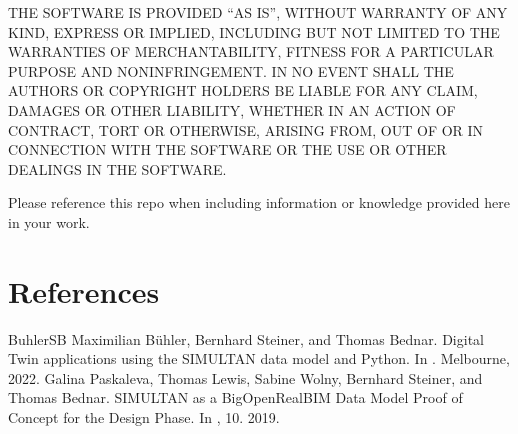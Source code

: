 \documentclass[letterpaper,10pt,english]{jupyterBook}
\begin{document}
\sphinxAtStartPar
THE SOFTWARE IS PROVIDED “AS IS”, WITHOUT WARRANTY OF ANY KIND, EXPRESS OR IMPLIED, INCLUDING BUT NOT LIMITED TO THE
WARRANTIES OF MERCHANTABILITY, FITNESS FOR A PARTICULAR PURPOSE AND NONINFRINGEMENT. IN NO EVENT SHALL THE AUTHORS OR
COPYRIGHT HOLDERS BE LIABLE FOR ANY CLAIM, DAMAGES OR OTHER LIABILITY, WHETHER IN AN ACTION OF CONTRACT, TORT OR
OTHERWISE, ARISING FROM, OUT OF OR IN CONNECTION WITH THE SOFTWARE OR THE USE OR OTHER DEALINGS IN THE SOFTWARE.

\sphinxAtStartPar
Please reference this repo when including information or knowledge provided here in your work.

\sphinxstepscope


\chapter{References}
\label{\detokenize{References:references}}\label{\detokenize{References:id1}}\label{\detokenize{References::doc}}
\begin{sphinxthebibliography}{BuhlerSB}
\sphinxAtStartPar
{}
\sphinxAtStartPar
Maximilian Bühler, Bernhard Steiner, and Thomas Bednar. Digital Twin applications using the SIMULTAN data model and Python. In . Melbourne, 2022.
\sphinxAtStartPar
Galina Paskaleva, Thomas Lewis, Sabine Wolny, Bernhard Steiner, and Thomas Bednar. SIMULTAN as a Big\sphinxhyphen{}Open\sphinxhyphen{}Real\sphinxhyphen{}BIM Data Model \sphinxhyphen{} Proof of Concept for the Design Phase. In , 10. 2019.
\end{sphinxthebibliography}







\renewcommand{\indexname}{Index}
\printindex
\end{document}
